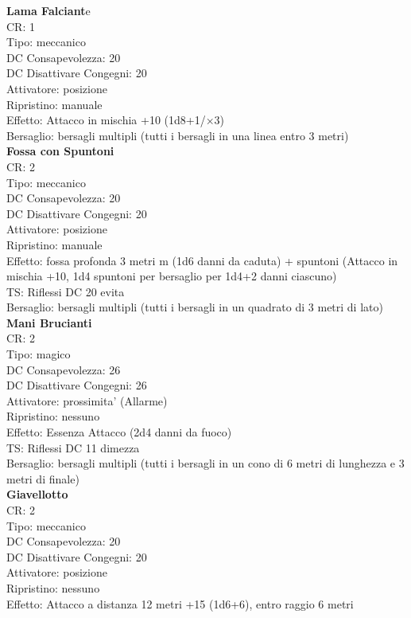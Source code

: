 \documentclass[a4paper,11pt,twoside,openany]{dndbook}
\begin{document}
{\begin{multicols}{2}
\textbf{Lama Falciant}e\\
CR: 1 \\
Tipo: meccanico \\
DC Consapevolezza: 20 \\
DC Disattivare Congegni: 20 \\
Attivatore: posizione \\
Ripristino: manuale \\
Effetto: Attacco in mischia +10 (1d8+1/×3) \\
Bersaglio: bersagli multipli (tutti i bersagli in una linea entro 3 metri)\\

\textbf{Fossa con Spuntoni}\\
CR: 2 \\
Tipo: meccanico \\
DC Consapevolezza: 20 \\
DC Disattivare Congegni: 20 \\
Attivatore: posizione \\
Ripristino: manuale \\
Effetto: fossa profonda 3 metri m (1d6 danni da caduta) + spuntoni (Attacco in mischia +10, 1d4 spuntoni per bersaglio per 1d4+2 danni ciascuno) \\
TS: Riflessi DC 20 evita \\
Bersaglio: bersagli multipli (tutti i bersagli in un quadrato di 3 metri di lato)\\

\textbf{Mani Brucianti}\\
CR: 2 \\
Tipo: magico \\
DC Consapevolezza: 26 \\
DC Disattivare Congegni: 26 \\
Attivatore: prossimita' (Allarme) \\
Ripristino: nessuno \\
Effetto: Essenza Attacco (2d4 danni da fuoco) \\
TS: Riflessi DC 11 dimezza \\
Bersaglio: bersagli multipli (tutti i bersagli in un cono di 6 metri di lunghezza e 3 metri di finale)\\

\textbf{Giavellotto}\\
CR: 2 \\
Tipo: meccanico \\
DC Consapevolezza: 20 \\
DC Disattivare Congegni: 20 \\
Attivatore: posizione \\
Ripristino: nessuno \\
Effetto: Attacco a distanza 12 metri +15 (1d6+6), entro raggio 6 metri\\


\end{multicols}}
\end{document}
